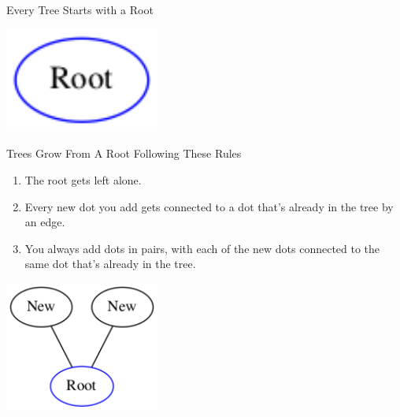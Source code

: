 \documentclass{beamer}
\begin{document}
\begin{frame}
\begin{center}
    \Large\sc
     Every Tree Starts with a Root
\end{center}
    \begin{center}
    \includegraphics[width=2in]{G0.png}
    \end{center}
\end{frame}

\begin{frame}
\begin{center}
    \Large\sc Trees Grow From A Root Following These Rules
\end{center}
\begin{enumerate}
\item The root gets left alone.
\item Every new dot you add gets connected to a dot that's already in the tree by an edge.
\item You always add dots in pairs, with each of the new dots connected to the same dot that's already in the tree.
\end{enumerate}
\begin{center}
    \includegraphics[width=2in]{G1.png}
    \end{center}
\end{frame}
\end{document}

